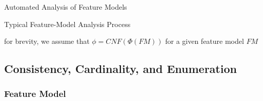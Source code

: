\begin{frame}{Automated Analysis of Feature Models}
\begin{mycolumns}[widths={52}]
\begin{definition}{Typical Feature-Model Analysis Process}
		\end{definition}
		\begin{note}{}
			for brevity, we assume that $\phi = CNF(\Phi(FM))$ for a given feature model $FM$
		\end{note}
	\end{mycolumns}
\end{frame}


\subsection{Consistency, Cardinality, and Enumeration}

\subsubsection{Feature Model}

